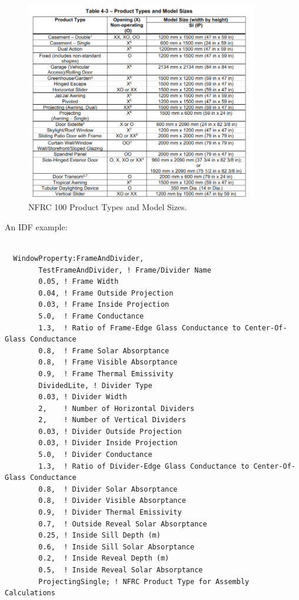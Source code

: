 \begin{figure}[hbtp] %
\centering
\includegraphics[width=0.9\textwidth, height=0.9\textheight, keepaspectratio=true]{media/NFRC100-Table4-3.PNG}
\caption{NFRC 100 Product Types and Model Sizes. \protect \label{fig:nfrc100-product-types}}
\end{figure}

An IDF example:

\begin{lstlisting}

  WindowProperty:FrameAndDivider,
        TestFrameAndDivider, ! Frame/Divider Name
        0.05, ! Frame Width
        0.04, ! Frame Outside Projection
        0.03, ! Frame Inside Projection
        5.0,  ! Frame Conductance
        1.3,  ! Ratio of Frame-Edge Glass Conductance to Center-Of-Glass Conductance
        0.8,  ! Frame Solar Absorptance
        0.8,  ! Frame Visible Absorptance
        0.9,  ! Frame Thermal Emissivity
        DividedLite, ! Divider Type
        0.03, ! Divider Width
        2,    ! Number of Horizontal Dividers
        2,    ! Number of Vertical Dividers
        0.03, ! Divider Outside Projection
        0.03, ! Divider Inside Projection
        5.0,  ! Divider Conductance
        1.3,  ! Ratio of Divider-Edge Glass Conductance to Center-Of-Glass Conductance
        0.8,  ! Divider Solar Absorptance
        0.8,  ! Divider Visible Absorptance
        0.9,  ! Divider Thermal Emissivity
        0.7,  ! Outside Reveal Solar Absorptance
        0.25, ! Inside Sill Depth (m)
        0.6,  ! Inside Sill Solar Absorptance
        0.2,  ! Inside Reveal Depth (m)
        0.5,  ! Inside Reveal Solar Absorptance
        ProjectingSingle; ! NFRC Product Type for Assembly Calculations
\end{lstlisting}

